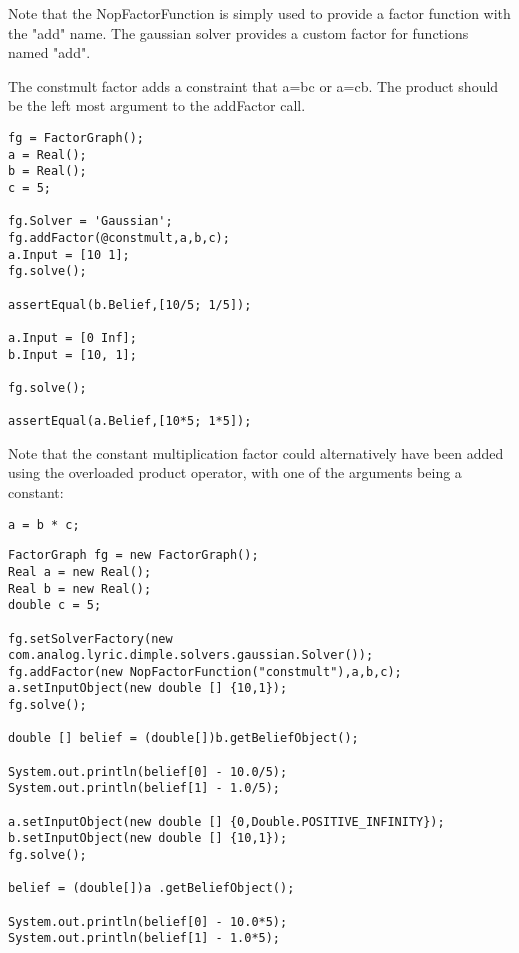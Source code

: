 Note that the NopFactorFunction is simply used to provide a factor function with the "add" name.  The gaussian solver provides a custom factor for functions named "add".
\fi



The constmult factor adds a constraint that a=bc or a=cb. The product should be the left most argument to the addFactor call.

\ifmatlab
\begin{lstlisting}
fg = FactorGraph();
a = Real();
b = Real();
c = 5;

fg.Solver = 'Gaussian';
fg.addFactor(@constmult,a,b,c);
a.Input = [10 1];
fg.solve();

assertEqual(b.Belief,[10/5; 1/5]);
     
a.Input = [0 Inf];
b.Input = [10, 1];
   
fg.solve();
    
assertEqual(a.Belief,[10*5; 1*5]);
\end{lstlisting}


Note that the constant multiplication factor could alternatively have been added using the overloaded product operator, with one of the arguments being a constant:

\begin{lstlisting}
a = b * c;
\end{lstlisting}

\fi

\ifjava
\begin{lstlisting}
FactorGraph fg = new FactorGraph();
Real a = new Real();
Real b = new Real();
double c = 5;

fg.setSolverFactory(new com.analog.lyric.dimple.solvers.gaussian.Solver());		
fg.addFactor(new NopFactorFunction("constmult"),a,b,c);
a.setInputObject(new double [] {10,1});
fg.solve();

double [] belief = (double[])b.getBeliefObject();

System.out.println(belief[0] - 10.0/5);
System.out.println(belief[1] - 1.0/5);

a.setInputObject(new double [] {0,Double.POSITIVE_INFINITY});
b.setInputObject(new double [] {10,1});
fg.solve();

belief = (double[])a .getBeliefObject();

System.out.println(belief[0] - 10.0*5);
System.out.println(belief[1] - 1.0*5);
\end{lstlisting}
\fi



